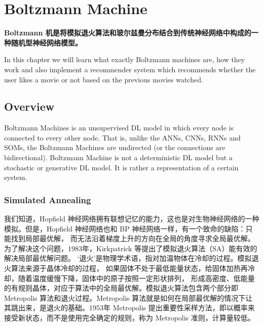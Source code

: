 ﻿


\chapter{Boltzmann Machine}
\setcounter{section}{-1}


{\bf 
Boltzmann 机是将模拟退火算法和玻尔兹曼分布结合到传统神经网络中构成的一种随机型神经网络模型。}

In this chapter we will learn what exactly Boltzmann machines are, how they work 
and also implement a recommender system which recommends whether the user likes 
a movie or not based on the previous movies watched.


\section{Overview}

Boltzmann Machines is an unsupervised DL model in which every node is connected to 
every other node. That is, unlike the ANNs, CNNs, RNNs and SOMs, the Boltzmann 
Machines are undirected (or the connections are bidirectional). Boltzmann Machine 
is not a deterministic DL model but a stochastic or generative DL model. It is 
rather a representation of a certain system. 


\subsection{Simulated Annealing}

我们知道，Hopfield 神经网络拥有联想记忆的能力，这也是对生物神经网络的一种模拟。但是，Hopfield 
神经网络也和 BP 神经网络一样，有一个致命的缺陷：只能找到局部最优解，
而无法沿着梯度上升的方向在全局的角度寻求全局最优解。
为了解决这个问题，1983年，Kirkpatrick 等提出了模拟退火算法（SA）能有效的解决局部最优解问题。
‘退火’是物理学术语，指对加温物体在冷却的过程。模拟退火算法来源于晶体冷却的过程，
如果固体不处于最低能量状态，给固体加热再冷却，随着温度缓慢下降，固体中的原子按照一定形状排列，
形成高密度、低能量的有规则晶体，对应于算法中的全局最优解。模拟退火算法包含两个部分即 Metropolis 
算法和退火过程。Metropolis 算法就是如何在局部最优解的情况下让其跳出来，是退火的基础。1953年 
Metropolis 提出重要性采样方法，即以概率来接受新状态，而不是使用完全确定的规则，称为 Metropolis 
准则，计算量较低。

